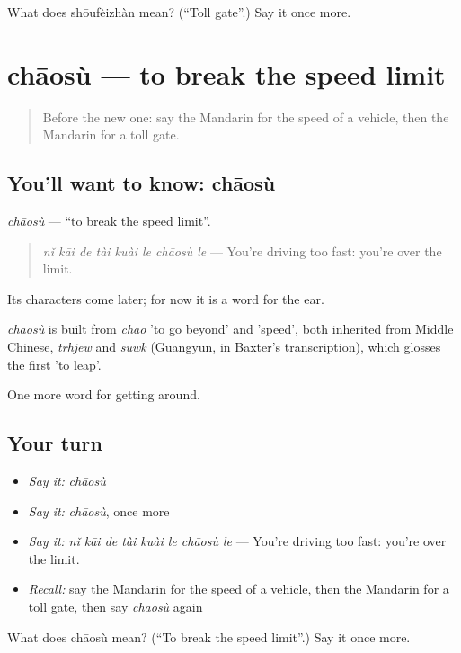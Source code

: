 \begin{tcolorbox}[breakable,colback=teal!4,colframe=teal!35!black,title={Before you move on}]
What does shōufèizhàn mean? (\textquotedblleft{}Toll gate\textquotedblright{}.) Say it once more.
\end{tcolorbox}
\section[chāosù]{chāosù — to break the speed limit}

\label{lesson:ZH-C421-chaosu}



\begin{quote}
Before the new one: say the Mandarin for the speed of a vehicle, then the Mandarin for a toll gate.
\end{quote}

\subsection*{You'll want to know: chāosù}
\emph{chāosù} — \textquotedblleft{}to break the speed limit\textquotedblright{}.

\begin{quote}
\emph{nǐ kāi de tài kuài le chāosù le} — You're driving too fast: you're over the limit.
\end{quote}

Its characters come later; for now it is a word for the ear.

\begin{cousinweb}
\emph{chāosù} is built from \emph{chāo} 'to go beyond' and  'speed', both inherited from Middle Chinese, \emph{trhjew} and \emph{suwk} (Guangyun, in Baxter's transcription), which glosses the first 'to leap'.
\end{cousinweb}

\begin{grammarlens}[title={What you've built}]
One more word for getting around.
\end{grammarlens}

\subsection*{Your turn}
\begin{itemize}
\raggedright
  \item \emph{Say it:} \emph{chāosù}
  \item \emph{Say it:} \emph{chāosù}, once more
  \item \emph{Say it:} \emph{nǐ kāi de tài kuài le chāosù le} — You're driving too fast: you're over the limit.
  \item \emph{Recall:} say the Mandarin for the speed of a vehicle, then the Mandarin for a toll gate, then say \emph{chāosù} again
\end{itemize}

\begin{tcolorbox}[breakable,colback=teal!4,colframe=teal!35!black,title={Before you move on}]
What does chāosù mean? (\textquotedblleft{}To break the speed limit\textquotedblright{}.) Say it once more.
\end{tcolorbox}
